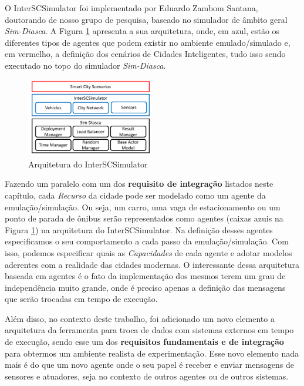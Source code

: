 O InterSCSimulator foi implementado por Eduardo Zambom Santana, doutorando de nosso grupo de pesquisa, baseado no simulador de âmbito geral \textit{Sim-Diasca}.
A Figura \ref{fig:simulator_architecture} apresenta a sua arquitetura, onde, em azul, estão os diferentes tipos de agentes que podem existir no ambiente
emulado/simulado e, em vermelho, a definição dos cenários de Cidades Inteligentes, tudo isso sendo executado no topo do simulador \textit{Sim-Diasca}.

\begin{figure}[ht]
	\centering
	\includegraphics[width=0.5\textwidth]{figuras/Arquitetura.pdf}
	\caption{Arquitetura do InterSCSimulator}
	\label{fig:simulator_architecture}
\end{figure}

Fazendo um paralelo com um dos \textbf{requisito de integração} listados neste capítulo, cada \textit{Recurso} da cidade pode ser modelado como um agente da emulação/simulação.
Ou seja, um carro, uma vaga de estacionamento ou um ponto de parada de ônibus serão representados como agentes (caixas azuis na Figura \ref{fig:simulator_architecture})
na arquitetura do InterSCSimulator.
Na definição desses agentes especificamos o seu comportamento a cada passo da emulação/simulação.
Com isso, podemos especificar quais as \textit{Capacidades} de cada agente e adotar modelos aderentes com a realidade das cidades modernas.
O interessante dessa arquitetura baseada em agentes é o fato da implementação dos mesmos terem um grau de independência muito grande, onde é preciso apenas a definição
das mensagens que serão trocadas em tempo de execução.

Além disso, no contexto deste trabalho, foi adicionado um novo elemento a arquitetura da ferramenta para troca de dados com sistemas externos em tempo de execução,
sendo esse um dos \textbf{requisitos fundamentais e de integração} para obtermos um ambiente realista de experimentação.
Esse novo elemento nada mais é do que um novo agente onde o seu papel é receber e enviar mensagens de sensores e atuadores, seja no contexto de outros agentes ou de
outros sistemas.

